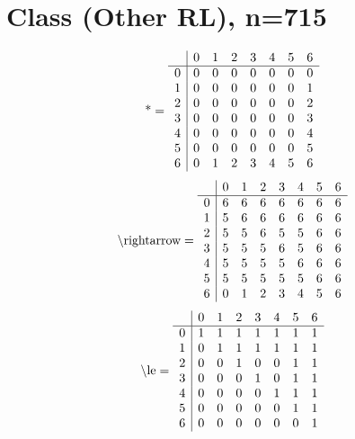 \documentclass[11pt]{article}
\begin{document}
\section{Class (Other RL), n=715}
\[\text{*} = 
\begin{array}{r | r r r r r r r}
 & 0 & 1 & 2 & 3 & 4 & 5 & 6 \\ \hline
0 & 0 & 0 & 0 & 0 & 0 & 0 & 0 \\
1 & 0 & 0 & 0 & 0 & 0 & 0 & 1 \\
2 & 0 & 0 & 0 & 0 & 0 & 0 & 2 \\
3 & 0 & 0 & 0 & 0 & 0 & 0 & 3 \\
4 & 0 & 0 & 0 & 0 & 0 & 0 & 4 \\
5 & 0 & 0 & 0 & 0 & 0 & 0 & 5 \\
6 & 0 & 1 & 2 & 3 & 4 & 5 & 6 \\
\end{array}
\]
\[\text{\textbackslash rightarrow} = 
\begin{array}{r | r r r r r r r}
 & 0 & 1 & 2 & 3 & 4 & 5 & 6 \\ \hline
0 & 6 & 6 & 6 & 6 & 6 & 6 & 6 \\
1 & 5 & 6 & 6 & 6 & 6 & 6 & 6 \\
2 & 5 & 5 & 6 & 5 & 5 & 6 & 6 \\
3 & 5 & 5 & 5 & 6 & 5 & 6 & 6 \\
4 & 5 & 5 & 5 & 5 & 6 & 6 & 6 \\
5 & 5 & 5 & 5 & 5 & 5 & 6 & 6 \\
6 & 0 & 1 & 2 & 3 & 4 & 5 & 6 \\
\end{array}
\]
\[\text{\textbackslash le} = 
\begin{array}{r | r r r r r r r}
 & 0 & 1 & 2 & 3 & 4 & 5 & 6 \\ \hline
0 & 1 & 1 & 1 & 1 & 1 & 1 & 1 \\
1 & 0 & 1 & 1 & 1 & 1 & 1 & 1 \\
2 & 0 & 0 & 1 & 0 & 0 & 1 & 1 \\
3 & 0 & 0 & 0 & 1 & 0 & 1 & 1 \\
4 & 0 & 0 & 0 & 0 & 1 & 1 & 1 \\
5 & 0 & 0 & 0 & 0 & 0 & 1 & 1 \\
6 & 0 & 0 & 0 & 0 & 0 & 0 & 1 \\
\end{array}
\]
\end{document}
